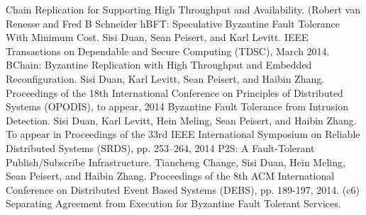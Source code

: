 \documentclass[letterpaper, 10 pt, conference]{ieeeconf}  %
\begin{document}
\begin{thebibliography}{99}

 Chain Replication for Supporting High Throughput and Availability. (Robert van Renesse and Fred B Schneider
 hBFT: Speculative Byzantine Fault Tolerance With Minimum Cost. Sisi Duan, Sean Peisert, and Karl Levitt. IEEE Transactions on Dependable and Secure
Computing (TDSC), March 2014.
 BChain: Byzantine Replication with High Throughput and Embedded Reconfiguration. Sisi Duan, Karl Levitt, Sean Peisert, and Haibin Zhang. Proceedings of the 18th International Conference on Principles of Distributed Systems (OPODIS), to appear, 2014
 Byzantine Fault Tolerance from Intrusion Detection. Sisi Duan, Karl Levitt, Hein Meling, Sean Peisert, and Haibin Zhang. To appear in Proceedings of the 33rd IEEE International Symposium on Reliable Distributed Systems (SRDS), pp. 253–264, 2014
 P2S: A Fault-Tolerant Publish/Subscribe Infrastructure. Tiancheng Change, Sisi Duan, Hein Meling, Sean Peisert, and Haibin Zhang. Proceedings of the 8th ACM International Conference on Distributed Event Based Systems (DEBS), pp. 189-197, 2014.
\bibitem(c6) Separating Agreement from Execution for Byzantine Fault Tolerant Services.

\end{thebibliography}
\end{document}

